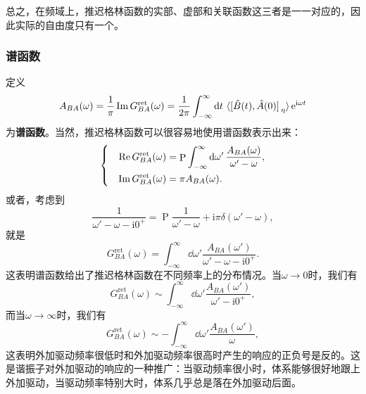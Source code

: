 \documentclass[hyperref, UTF8, a4paper]{ctexart}
\DeclareMathOperator{\primevalue}{P}
\newcommand*{\ii}{\mathrm{i}}
\newcommand*{\ee}{\mathrm{e}}
\newenvironment{bigcase}{\left\{\quad\begin{aligned}}{\end{aligned}\right.}
\begin{document}
总之，在频域上，推迟格林函数的实部、虚部和关联函数这三者是一一对应的，因此实际的自由度只有一个。

\subsubsection{谱函数}\label{sec:spectral-function}


定义%
\begin{equation}
    A_{BA}(\omega) = \frac{1}{\pi} \Im G_{BA}^\text{ret}(\omega) = \frac{1}{2 \pi} \int_{-\infty}^\infty \dd{t} \expval*{\comm*{\hat{B}(t)}{\hat{A}(0)}_\eta} \ee^{\ii \omega t}
\end{equation}
为\textbf{谱函数}。当然，推迟格林函数可以很容易地使用谱函数表示出来：%
\begin{equation}
    \begin{bigcase}
        \Re G_{BA}^\text{ret}(\omega) &= \primevalue \int_{-\infty}^\infty \dd{\omega'} \frac{A_{BA}(\omega)}{\omega'-\omega} , \\
        \Im G_{BA}^\text{ret}(\omega) &= \pi A_{BA}(\omega).
    \end{bigcase}
\end{equation}
或者，考虑到
\[
    \frac{1}{\omega'-\omega-\ii 0^+} = \primevalue \frac{1}{\omega'-\omega} + \ii \pi \delta(\omega'-\omega),
\]
就是
\begin{equation}
    G_{BA}^\text{ret}(\omega) = \int_{-\infty}^\infty \dd{\omega'} \frac{A_{BA}(\omega')}{\omega' - \omega - \ii 0^+}.
\end{equation}
这表明谱函数给出了推迟格林函数在不同频率上的分布情况。当$\omega\to 0$时，我们有
\[
    G_{BA}^\text{ret}(\omega) \sim \int_{-\infty}^\infty \dd{\omega'} \frac{A_{BA}(\omega')}{\omega' - \ii 0^+},
\]
而当$\omega\to \infty$时，我们有
\[
    G_{BA}^\text{ret}(\omega) \sim - \int_{-\infty}^\infty \dd{\omega'} \frac{A_{BA}(\omega')}{\omega},
\]
这表明外加驱动频率很低时和外加驱动频率很高时产生的响应的正负号是反的。这是谐振子对外加驱动的响应的一种推广：当驱动频率很小时，体系能够很好地跟上外加驱动，当驱动频率特别大时，体系几乎总是落在外加驱动后面。
\end{document}
